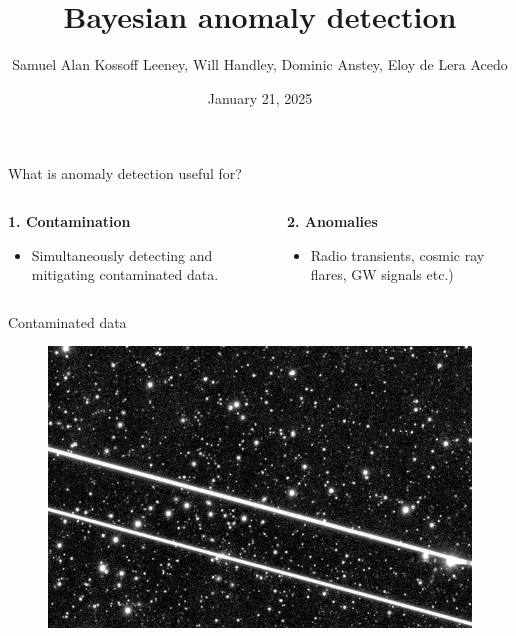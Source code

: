 \documentclass[aspectratio=169]{beamer}
\title{Bayesian anomaly detection}
\date{January 21, 2025}
\author{Samuel Alan Kossoff Leeney, Will Handley, Dominic Anstey, Eloy de Lera Acedo}
\institute{Will Handley's group meeting}
\begin{document}
\begin{frame}
  \titlepage
\end{frame}

\begin{frame}{What is anomaly detection useful for?}
  \begin{columns}
    \begin{column}{0.5\textwidth}
        \textbf{1. Contamination}
        \begin{itemize}
          \item Simultaneously detecting and mitigating contaminated data.
        \end{itemize}
    \end{column}
    \begin{column}{0.5\textwidth}
        \textbf{2. Anomalies}
        \begin{itemize}
          \item Radio transients, cosmic ray flares, GW signals etc.)
        \end{itemize}
    \end{column}
  \end{columns}
\end{frame}

\begin{frame}{Contaminated data}
  \begin{figure}
    \centering
    \includegraphics[width=\textwidth]{images/starlink2.png}
  \end{figure}
\end{frame}
\end{document}
